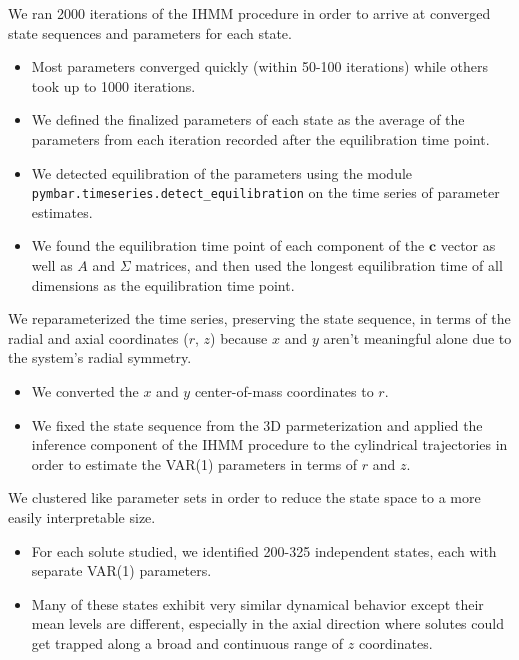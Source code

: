 \documentclass{article}
\begin{document}
  We ran 2000 iterations of the IHMM procedure in order to arrive at converged 
  state sequences and parameters for each state.
  \begin{itemize}  
   \item Most parameters converged quickly (within 50-100 iterations) while
    others took up to 1000 iterations.
    \item We defined the finalized parameters of each state as the average
    of the parameters from each iteration recorded after the equilibration 
    time point.
    \item We detected equilibration of the parameters using the module 
    \texttt{pymbar.timeseries.detect\_equilibration} on the time series of 
    parameter estimates. 
    \item We found the equilibration time point of each component of the 
    $\mathbf{c}$ vector as well as $A$ and $\Sigma$ matrices, and then used the longest
    equilibration time of all dimensions as the equilibration time point.
  \end{itemize}
  
  We reparameterized the time series, preserving the state sequence, in terms
  of the radial and axial coordinates ($r$, $z$) because $x$ and $y$ aren't 
  meaningful alone due to the system's radial symmetry.
  \begin{itemize}
    \item We converted the $x$ and $y$ center-of-mass coordinates to $r$.
    \item We fixed the state sequence from the 3D parmeterization and applied the
    inference component of the IHMM procedure to the cylindrical trajectories in
    order to estimate the VAR(1) parameters in terms of $r$ and $z$.
  \end{itemize} 
  
  We clustered like parameter sets in order to reduce the state space to
  a more easily interpretable size.
  \begin{itemize}
  	\item For each solute studied, we identified 200-325 independent states, each
   	with separate VAR(1) parameters.
   	\item Many of these states exhibit very similar dynamical behavior except their
   	mean levels are different, especially in the axial direction where solutes could
   	get trapped along a broad and continuous range of $z$ coordinates. 
  \end{itemize}
  
\end{document}
